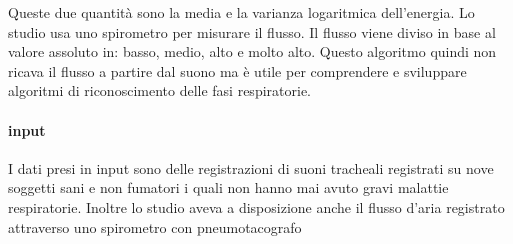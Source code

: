 \begin{frame}
    Queste due quantit\`a sono la media e la varianza logaritmica dell'energia. 
    Lo studio usa uno spirometro per misurare il flusso. 
    Il flusso viene diviso in base al valore assoluto in: basso, medio, alto e molto alto. 
    Questo algoritmo quindi non ricava il flusso a partire dal suono ma \`e utile per comprendere e sviluppare algoritmi di riconoscimento delle fasi respiratorie.


    \paragraph{input}
      I dati presi in input sono delle registrazioni di suoni tracheali registrati su nove soggetti sani e non fumatori i quali non hanno mai avuto gravi malattie respiratorie. 
      Inoltre lo studio aveva a disposizione anche il flusso d'aria registrato attraverso uno spirometro con pneumotacografo

\end{frame}
